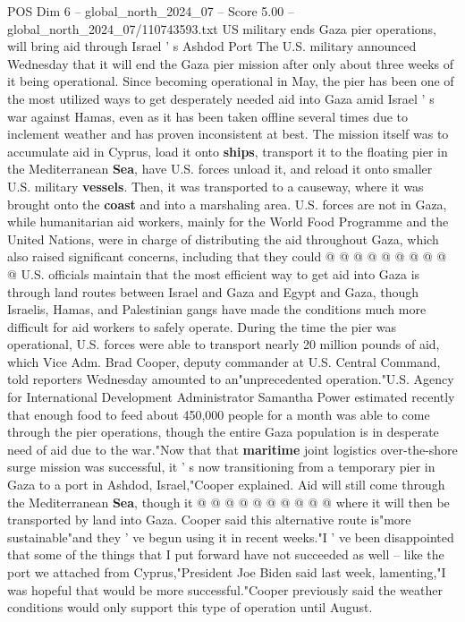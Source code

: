 \begin{textsample}{POS Dim 6 – global\_north\_2024\_07 – Score 5.00 – global\_north\_2024\_07/110743593.txt}  \label{ex:f6_pos_239}
US military ends Gaza pier operations, will bring aid through Israel ' s Ashdod Port The U.S. military announced Wednesday that it will end the Gaza pier mission after only about three weeks of it being operational.
Since becoming operational in May, the pier has been one of the most utilized ways to get desperately needed aid into Gaza amid Israel ' s war against Hamas, even as it has been taken offline several times due to inclement weather and has proven inconsistent at best.
The mission itself was to accumulate aid in Cyprus, load it onto \textbf{ships}, transport it to the floating pier in the Mediterranean \textbf{Sea}, have U.S. forces unload it, and reload it onto smaller U.S. military \textbf{vessels}.
Then, it was transported to a causeway, where it was brought onto the \textbf{coast} and into a marshaling area.
U.S. forces are not in Gaza, while humanitarian aid workers, mainly for the World Food Programme and the United Nations, were in charge of distributing the aid throughout Gaza, which also raised significant concerns, including that they could @ @ @ @ @ @ @ @ @ @ U.S. officials maintain that the most efficient way to get aid into Gaza is through land routes between Israel and Gaza and Egypt and Gaza, though Israelis, Hamas, and Palestinian gangs have made the conditions much more difficult for aid workers to safely operate.
During the time the pier was operational, U.S. forces were able to transport nearly 20 million pounds of aid, which Vice Adm.
Brad Cooper, deputy commander at U.S.
Central Command, told reporters Wednesday amounted to an"unprecedented operation."U.S.
Agency for International Development Administrator Samantha Power estimated recently that enough food to feed about 450,000 people for a month was able to come through the pier operations, though the entire Gaza population is in desperate need of aid due to the war."Now that that \textbf{maritime} joint logistics over-the-shore surge mission was successful, it ' s now transitioning from a temporary pier in Gaza to a port in Ashdod, Israel,"Cooper explained.
Aid will still come through the Mediterranean \textbf{Sea}, though it @ @ @ @ @ @ @ @ @ @ where it will then be transported by land into Gaza.
Cooper said this alternative route is"more sustainable"and they ' ve begun using it in recent weeks."I ' ve been disappointed that some of the things that I put forward have not succeeded as well -- like the port we attached from Cyprus,"President Joe Biden said last week, lamenting,"I was hopeful that would be more successful."Cooper previously said the weather conditions would only support this type of operation until August.

\end{textsample}

